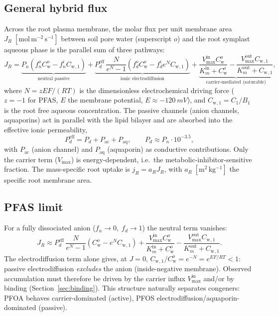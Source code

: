 \documentclass[12pt,a4paper]{article}
\newcommand{\Cw}{C_{\mathrm{w}}}
\begin{document}
\subsection{General hybrid flux}

Across the root plasma membrane, the molar flux per unit membrane area $J_R\;[\mathrm{mol\,m^{-2}\,s^{-1}}]$ between soil pore water (superscript $o$) and the root symplast aqueous phase is the parallel sum of three pathways:
\begin{equation}\label{eq:JR}
    J_R=\underbrace{P_n\!\left(f_n^{o}\Cw^{o}-f_n^{i}\Cw{}_{,1}\right)}_{\text{neutral passive}}
    +\underbrace{P_d^{\mathrm{eff}}\,\frac{N}{e^{N}-1}\!\left(f_d^{o}\Cw^{o}-f_d^{i}e^{N}\Cw{}_{,1}\right)}_{\text{ionic electrodiffusion}}
    +\underbrace{\frac{V_{\max}^{\mathrm{in}}\Cw^{o}}{K_m^{\mathrm{in}}+\Cw^{o}}-\frac{V_{\max}^{\mathrm{out}}\Cw{}_{,1}}{K_m^{\mathrm{out}}+\Cw{}_{,1}}}_{\text{carrier-mediated (saturable)}},
\end{equation}
where $N=zEF/(RT)$ is the dimensionless electrochemical driving force ($z=-1$ for PFAS, $E$ the membrane potential, $E\approx-\SI{120}{mV}$), and $\Cw{}_{,1}=C_1/B_1$ is the root free aqueous concentration.  The passive channels (anion channels, aquaporins) act in parallel with the lipid bilayer and are absorbed into the effective ionic permeability,
\begin{equation}\label{eq:Pdeff}
    P_d^{\mathrm{eff}}=P_d+P_\mathrm{ac}+P_\mathrm{aq},\qquad P_d\approx P_n\cdot10^{-3.5},
\end{equation}
with $P_\mathrm{ac}$ (anion channel) and $P_\mathrm{aq}$ (aquaporin) as conductive contributions.  Only the carrier term ($V_{\max}$) is energy-dependent, i.e.\ the metabolic-inhibitor-sensitive fraction.  The mass-specific root uptake is $j_R=a_R J_R$, with $a_R\;[\mathrm{m^2\,kg^{-1}}]$ the specific root membrane area.

\subsection{PFAS limit}

For a fully dissociated anion ($f_n\to0,\;f_d\to1$) the neutral term vanishes:
\begin{equation}\label{eq:JR_pfas}
    J_R\approx P_d^{\mathrm{eff}}\,\frac{N}{e^{N}-1}\!\left(\Cw^{o}-e^{N}\Cw{}_{,1}\right)
    +\frac{V_{\max}^{\mathrm{in}}\Cw^{o}}{K_m^{\mathrm{in}}+\Cw^{o}}-\frac{V_{\max}^{\mathrm{out}}\Cw{}_{,1}}{K_m^{\mathrm{out}}+\Cw{}_{,1}}.
\end{equation}
The electrodiffusion term alone gives, at $J=0$, $\Cw{}_{,1}/\Cw^{o}=e^{-N}=e^{EF/RT}<1$: passive electrodiffusion \emph{excludes} the anion (inside-negative membrane).  Observed accumulation must therefore be driven by the carrier influx $V_{\max}^{\mathrm{in}}$ and/or by binding (Section~\ref{sec:binding}).  This structure naturally separates congeners: PFOA behaves carrier-dominated (active), PFOS electrodiffusion/aquaporin-dominated (passive).
\end{document}
